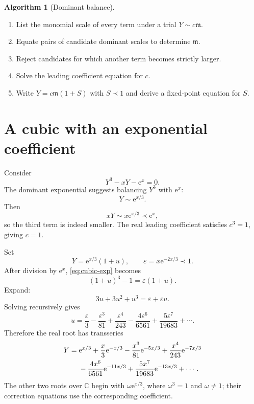 \documentclass[11pt,openany]{book}
\theoremstyle{definition}
\newtheorem{algorithm}{Algorithm}[chapter]
\theoremstyle{plain}
\theoremstyle{remark}
\newcommand{\C}{\mathbb{C}}
\newcommand{\m}{\mathfrak{m}}
\newcommand{\eps}{\varepsilon}
\newcommand{\e}{\mathrm{e}}
\newcommand{\asym}{\sim}
\newcommand{\precdom}{\prec}
\begin{document}
\begin{algorithm}[Dominant balance]
\begin{enumerate}
\item List the monomial scale of every term under a trial $Y\asym c\m$.
\item Equate pairs of candidate dominant scales to determine $\m$.
\item Reject candidates for which another term becomes strictly larger.
\item Solve the leading coefficient equation for $c$.
\item Write $Y=c\m(1+S)$ with $S\precdom1$ and derive a fixed-point equation for $S$.
\end{enumerate}
\end{algorithm}

\section{A cubic with an exponential coefficient}

Consider
\begin{equation}\label{eq:cubic-exp}
 Y^3-xY-\e^x=0.
\end{equation}
The dominant exponential suggests balancing $Y^3$ with $\e^x$:
\[
 Y\asym\e^{x/3}.
\]
Then
\[
 xY\asym x\e^{x/3}\precdom\e^x,
\]
so the third term is indeed smaller. The real leading coefficient satisfies $c^3=1$, giving $c=1$.

Set
\[
 Y=\e^{x/3}(1+u),
 \qquad
 \eps=x\e^{-2x/3}\precdom1.
\]
After division by $\e^x$, \cref{eq:cubic-exp} becomes
\begin{equation}\label{eq:cubic-u}
 (1+u)^3-1=\eps(1+u).
\end{equation}
Expand:
\[
 3u+3u^2+u^3=\eps+\eps u.
\]
Solving recursively gives
\begin{equation}\label{eq:cubic-u-series}
 u=\frac{\eps}{3}-\frac{\eps^3}{81}
 +\frac{\eps^4}{243}-\frac{4\eps^6}{6561}
 +\frac{5\eps^7}{19683}+\cdots.
\end{equation}
Therefore the real root has transseries
\begin{align}\label{eq:cubic-root}
 Y={}&\e^{x/3}
 +\frac{x}{3}\e^{-x/3}
 -\frac{x^3}{81}\e^{-5x/3}
 +\frac{x^4}{243}\e^{-7x/3}\\
 &-\frac{4x^6}{6561}\e^{-11x/3}
 +\frac{5x^7}{19683}\e^{-13x/3}+\cdots.
\notag
\end{align}
The other two roots over $\C$ begin with $\omega\e^{x/3}$, where $\omega^3=1$ and $\omega\ne1$; their correction equations use the corresponding coefficient.
\end{document}
